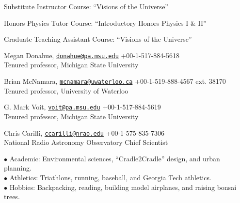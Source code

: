 \documentclass[12pt]{cv}
\begin{document}
\begin{llist}
Substitute Instructor
Course: ``Visions of the Universe''

Honors Physics Tutor
Course: ``Introductory Honors Physics I \& II''

Graduate Teaching Assistant
Course: ``Visions of the Universe''




Megan Donahue, \href{mailto:donahue@pa.msu.edu}{\tt donahue@pa.msu.edu} \hfill +00-1-517-884-5618\\
Tenured professor, Michigan State University

Brian McNamara, \href{mailto:mcnamara@uwaterloo.ca}{\tt mcnamara@uwaterloo.ca} \hfill +00-1-519-888-4567 ext. 38170\\
Tenured professor, University of Waterloo

G. Mark Voit, \href{mailto:voit@pa.msu.edu}{\tt voit@pa.msu.edu} \hfill +00-1-517-884-5619\\
Tenured professor, Michigan State University

Chris Carilli, \href{mailto:ccarilli@nrao.edu}{\tt ccarilli@nrao.edu} \hfill +00-1-575-835-7306\\
National Radio Astronomy Observatory Chief Scientist


$\bullet$ Academic: Environmental sciences, ``Cradle2Cradle'' design, and urban planning.\\
$\bullet$ Athletics: Triathlons, running, baseball, and Georgia Tech athletics.\\
$\bullet$ Hobbies: Backpacking, reading, building model airplanes, and raising bonsai trees.

\end{llist}
\end{document}
